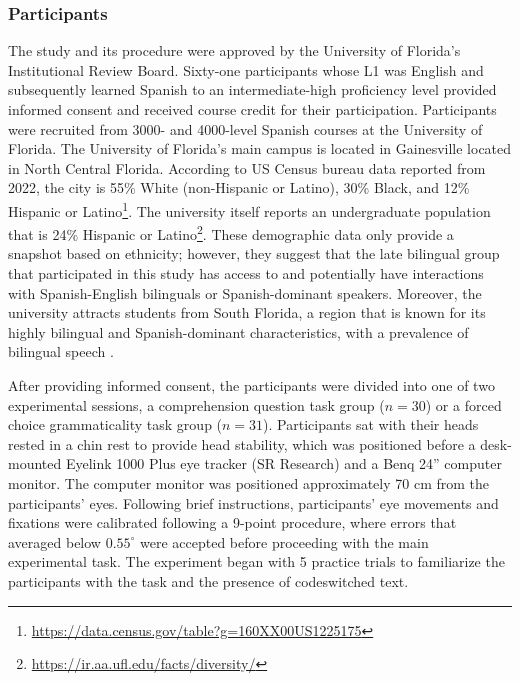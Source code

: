 \documentclass[output=paper,colorlinks,citecolor=brown]{langscibook}
\begin{document}
\subsubsection{Participants}
The study and its procedure were approved by the University of Florida’s Institutional Review Board. Sixty-one participants whose L1 was English and subsequently learned Spanish to an intermediate-high proficiency level provided informed consent and received course credit for their participation. Participants were recruited from 3000- and 4000-level Spanish courses at the University of Florida. The University of Florida’s main campus is located in Gainesville located in North Central Florida. According to US Census bureau data reported from 2022, the city is 55\% White (non-Hispanic or Latino), 30\% Black, and 12\% Hispanic or Latino\footnote{\url{https://data.census.gov/table?g=160XX00US1225175}}. The university itself reports an undergraduate population that is 24\% Hispanic or Latino\footnote{\url{https://ir.aa.ufl.edu/facts/diversity/}}. These demographic data only provide a snapshot based on ethnicity; however, they suggest that the late bilingual group that participated in this study has access to and potentially have interactions with Spanish-English bilinguals or Spanish-dominant speakers. Moreover, the university attracts students from South Florida, a region that is known for its highly bilingual and Spanish-dominant characteristics, with a prevalence of bilingual speech \citep{CarterLynch2015,Deucharetal2014}.

After providing informed consent, the participants were divided into one of two experimental sessions, a comprehension question task group ($n = 30$) or a forced choice grammaticality task group ($n = 31$). Participants sat with their heads rested in a chin rest to provide head stability, which was positioned before a desk-mounted Eyelink 1000 Plus eye tracker (SR Research) and a Benq 24'' computer monitor. The computer monitor was positioned approximately 70 cm from the participants’ eyes. Following brief instructions, participants’ eye movements and fixations were calibrated following a 9-point procedure, where errors that averaged below $0.55^{\circ}$ were accepted before proceeding with the main experimental task. The experiment began with 5 practice trials to familiarize the participants with the task and the presence of codeswitched text.
\end{document}
